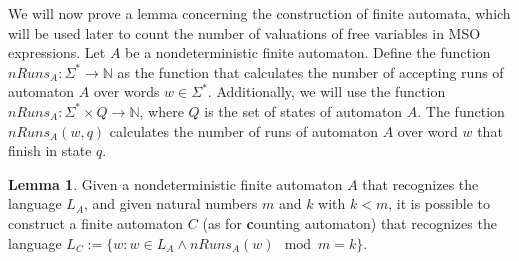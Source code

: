 \documentclass[12pt]{article}
\theoremstyle{definition}
\newtheorem{lemma}[theorem]{Lemma}
\begin{document}
We will now prove a lemma concerning the construction of finite automata, which will be used later to count the number of valuations of free variables in MSO expressions. Let $A$ be a nondeterministic finite automaton. Define the function $nRuns_A : \Sigma^* \rightarrow \mathbb{N}$ as the function that calculates the number of accepting runs of automaton $A$ over words $w \in \Sigma^*$. Additionally, we will use the function $nRuns_A : \Sigma^* \times Q \rightarrow \mathbb{N}$, where $Q$ is the set of states of automaton $A$. The function $nRuns_A(w, q)$ calculates the number of runs of automaton $A$ over word $w$ that finish in state $q$.

\begin{lemma}
    \label{CountRunsAutomaton}
    Given a nondeterministic finite automaton $A$ that recognizes the language $L_A$, and given natural numbers $m$ and $k$ with $k < m$, it is possible to construct a finite automaton $C$ (as for \textbf{c}ounting automaton) that recognizes the language $L_{C} := \{ w : w \in L_A \land nRuns_A(w) \mod m = k \}$.
\end{lemma}
\end{document}
